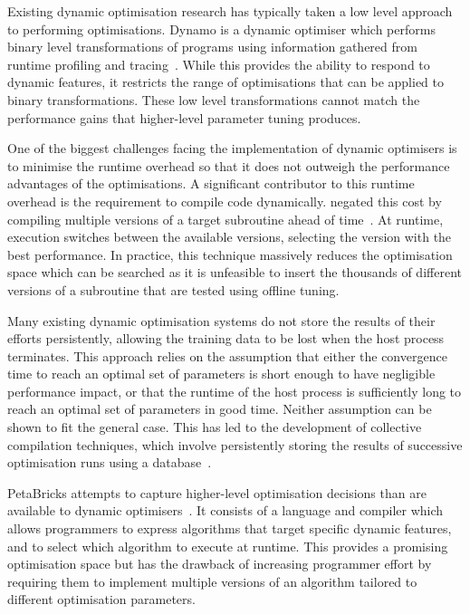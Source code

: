 Existing dynamic optimisation research has typically taken a low level
approach to performing optimisations. Dynamo is a dynamic optimiser
which performs binary level transformations of programs using
information gathered from runtime profiling and
tracing~\cite{Bala2000}. While this provides the ability to respond to
dynamic features, it restricts the range of optimisations that can be
applied to binary transformations. These low level transformations
cannot match the performance gains that higher-level parameter tuning
produces.

One of the biggest challenges facing the implementation of dynamic
optimisers is to minimise the runtime overhead so that it does not
outweigh the performance advantages of the optimisations. A
significant contributor to this runtime overhead is the requirement to
compile code dynamically. \citeauthor{Fursin2005} negated this cost by
compiling multiple versions of a target subroutine ahead of
time~\cite{Fursin2005}. At runtime, execution switches between the
available versions, selecting the version with the best
performance. In practice, this technique massively reduces the
optimisation space which can be searched as it is unfeasible to insert
the thousands of different versions of a subroutine that are tested
using offline tuning.

Many existing dynamic optimisation systems do not store the results of
their efforts persistently, allowing the training data to be lost when
the host process terminates. This approach relies on the assumption
that either the convergence time to reach an optimal set of parameters
is short enough to have negligible performance impact, or that the
runtime of the host process is sufficiently long to reach an optimal
set of parameters in good time. Neither assumption can be shown to fit
the general case. This has led to the development of collective
compilation techniques, which involve persistently storing the results
of successive optimisation runs using a database~\cite{Fursin2010}.

PetaBricks attempts to capture higher-level optimisation decisions
than are available to dynamic optimisers~\cite{Ansel2009a}. It
consists of a language and compiler which allows programmers to
express algorithms that target specific dynamic features, and to
select which algorithm to execute at runtime. This provides a
promising optimisation space but has the drawback of increasing
programmer effort by requiring them to implement multiple versions of
an algorithm tailored to different optimisation parameters.

